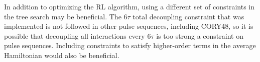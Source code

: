 In addition to optimizing the RL algorithm, using a different set of constraints in the tree search may be beneficial. The $6\tau$ total decoupling constraint that was implemented is not followed in other pulse sequences, including CORY48, so it is possible that decoupling all interactions every $6\tau$ is too strong a constraint on pulse sequences. Including constraints to satisfy higher-order terms in the average Hamiltonian would also be beneficial.

